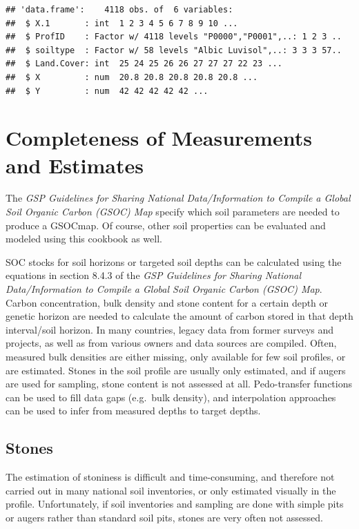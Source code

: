 \documentclass[10pt,b5paper,]{book}
\theoremstyle{definition}
\theoremstyle{definition}
\theoremstyle{definition}
\theoremstyle{remark}
\begin{document}
\begin{verbatim}
## 'data.frame':    4118 obs. of  6 variables:
##  $ X.1       : int  1 2 3 4 5 6 7 8 9 10 ...
##  $ ProfID    : Factor w/ 4118 levels "P0000","P0001",..: 1 2 3 ..
##  $ soiltype  : Factor w/ 58 levels "Albic Luvisol",..: 3 3 3 57..
##  $ Land.Cover: int  25 24 25 26 26 27 27 27 22 23 ...
##  $ X         : num  20.8 20.8 20.8 20.8 20.8 ...
##  $ Y         : num  42 42 42 42 42 ...
\end{verbatim}

\hypertarget{completeness-of-measurements-and-estimates}{%
\section{Completeness of Measurements and
Estimates}\label{completeness-of-measurements-and-estimates}}

The \emph{GSP Guidelines for Sharing National Data/Information to
Compile a Global Soil Organic Carbon (GSOC) Map} specify which soil
parameters are needed to produce a GSOCmap. Of course, other soil
properties can be evaluated and modeled using this cookbook as well.

SOC stocks for soil horizons or targeted soil depths can be calculated
using the equations in section 8.4.3 of the \emph{GSP Guidelines for
Sharing National Data/Information to Compile a Global Soil Organic
Carbon (GSOC) Map}. Carbon concentration, bulk density and stone content
for a certain depth or genetic horizon are needed to calculate the
amount of carbon stored in that depth interval/soil horizon. In many
countries, legacy data from former surveys and projects, as well as from
various owners and data sources are compiled. Often, measured bulk
densities are either missing, only available for few soil profiles, or
are estimated. Stones in the soil profile are usually only estimated,
and if augers are used for sampling, stone content is not assessed at
all. Pedo-transfer functions can be used to fill data gaps (e.g.~bulk
density), and interpolation approaches can be used to infer from
measured depths to target depths.

\hypertarget{stones}{%
\subsection{Stones}\label{stones}}

The estimation of stoniness is difficult and time-consuming, and
therefore not carried out in many national soil inventories, or only
estimated visually in the profile. Unfortunately, if soil inventories
and sampling are done with simple pits or augers rather than standard
soil pits, stones are very often not assessed.
\end{document}
